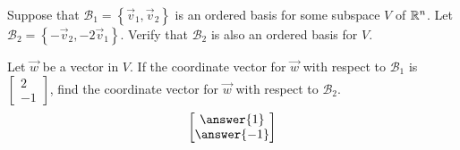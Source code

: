 \documentclass{ximera}
\author{}
\begin{document}
\begin{exercise}
Suppose that $\mathcal{B}_1=\left\{\vec{v}_1, \vec{v}_2\right\}$ is an ordered basis for some subspace $V$ of $\mathbb{R}^n$.  Let $\mathcal{B}_2=\left\{-\vec{v}_2, -2\vec{v}_1\right\}$.  Verify that $\mathcal{B}_2$ is also an ordered basis for $V$.

Let $\vec{w}$ be a vector in $V$.  If the coordinate vector for $\vec{w}$ with respect to $\mathcal{B}_1$ is $\begin{bmatrix}2\\-1\end{bmatrix}$, find the coordinate vector for $\vec{w}$ with respect to $\mathcal{B}_2$.
$$\begin{bmatrix}\answer{1}\\\answer{-1}\end{bmatrix}$$

\end{exercise}
\end{document}
